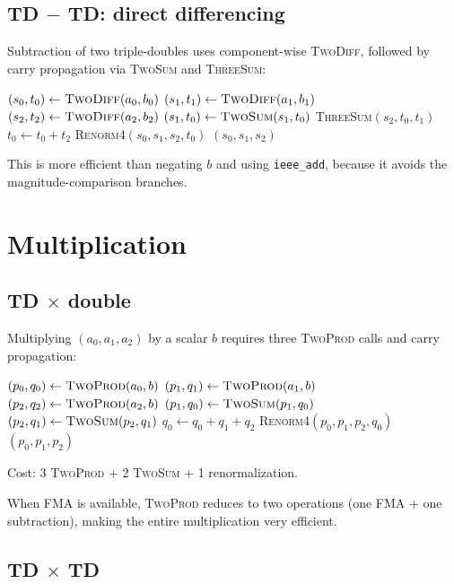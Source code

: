 \documentclass[11pt,a4paper]{article}
\begin{document}
\subsection{TD $-$ TD: direct differencing}

Subtraction of two triple-doubles uses component-wise
\textsc{TwoDiff}, followed by carry propagation via
\textsc{TwoSum} and \textsc{ThreeSum}:
\begin{algorithmic}[1]
\State $(s_0, t_0) \gets \textsc{TwoDiff}(a_0, b_0)$
\State $(s_1, t_1) \gets \textsc{TwoDiff}(a_1, b_1)$
\State $(s_2, t_2) \gets \textsc{TwoDiff}(a_2, b_2)$
\State $(s_1, t_0) \gets \textsc{TwoSum}(s_1, t_0)$
\State \textsc{ThreeSum}$(s_2, t_0, t_1)$
\State $t_0 \gets t_0 + t_2$
\State \textsc{Renorm4}$(s_0, s_1, s_2, t_0)$
\State \Return $(s_0, s_1, s_2)$
\end{algorithmic}
This is more efficient than negating $b$ and using
\texttt{ieee\_add}, because it avoids the magnitude-comparison
branches.


\section{Multiplication}
\label{sec:mul}

\subsection{TD $\times$ double}

Multiplying $(a_0, a_1, a_2)$ by a scalar $b$ requires three
\textsc{TwoProd} calls and carry propagation:
\begin{algorithmic}[1]
\State $(p_0, q_0) \gets \textsc{TwoProd}(a_0, b)$
\State $(p_1, q_1) \gets \textsc{TwoProd}(a_1, b)$
\State $(p_2, q_2) \gets \textsc{TwoProd}(a_2, b)$
\State $(p_1, q_0) \gets \textsc{TwoSum}(p_1, q_0)$
\State $(p_2, q_1) \gets \textsc{TwoSum}(p_2, q_1)$
\State $q_0 \gets q_0 + q_1 + q_2$
\State \textsc{Renorm4}$(p_0, p_1, p_2, q_0)$
\State \Return $(p_0, p_1, p_2)$
\end{algorithmic}
Cost: 3 \textsc{TwoProd} + 2 \textsc{TwoSum} + 1 renormalization.

When FMA is available, \textsc{TwoProd} reduces to two operations
(one FMA + one subtraction), making the entire multiplication very
efficient.

\subsection{TD $\times$ TD}
\end{document}
